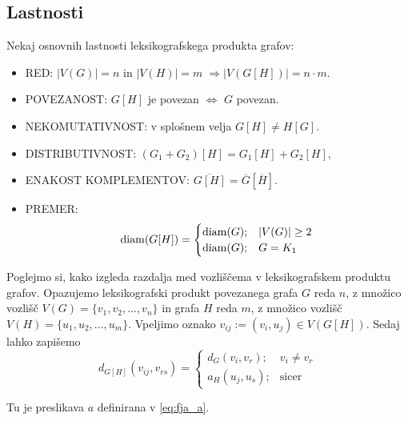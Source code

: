 \documentclass[mat1, tisk]{fmfdelo}
\newcommand{\1}{(1, 1, ..., 1)}
\newcommand{\2}{(2, 2, ..., 2)}
\begin{document}


\subsection{Lastnosti} \label{ss:lastnosti_leks_prod}
Nekaj osnovnih lastnosti leksikografskega produkta grafov:
\begin{itemize}
    \item RED: $|V(G)| = n$ in $|V(H)| = m \; \Rightarrow |V(G[H])| = n \cdot m.$
    \item POVEZANOST: $G[H]$ je povezan $\Leftrightarrow$ $G$ povezan. 
    \item NEKOMUTATIVNOST: v splošnem velja $G[H] \neq H[G].$
    \item DISTRIBUTIVNOST: $(G_1 + G_2)[H] = G_1[H] + G_2[H],$ 
    \item ENAKOST KOMPLEMENTOV: $\overline{G[H]} = \overline{G} [\overline{H}].$
    \item PREMER: $$ {\rm diam}(G[H]) =  \begin{cases} 
        {\rm diam}(G); & |V(G)| \geq 2 \\
        {\rm diam}(G); & G = K_1
        \end{cases}$$

\end{itemize}

Poglejmo si, kako izgleda razdalja med vozliščema v leksikografskem produktu grafov. 
Opazujemo leksikografski produkt povezanega grafa $G$ reda $n$, z množico vozlišč
$V(G) = \{v_1, v_2, ... , v_n \}$ in grafa $H$ reda $m$, z množico vozlišč 
$V(H) = \{u_1, u_2, ... , u_m \}$. Vpeljimo oznako 
$v_{ij} := (v_i, u_j) \in V(G[H]).$
Sedaj lahko zapišemo
\begin{equation} \label{eq:razdalja_produkta}
    d_{G[H]}(v_{ij}, v_{rs}) = 
    \begin{cases}
        d_G(v_i, v_r); & v_i \neq v_r \\
        a_H(u_j, u_s); & \text{sicer}
    \end{cases}
\end{equation} 

Tu je preslikava $a$ definirana v \ref{eq:fja_a}.


\end{document}

